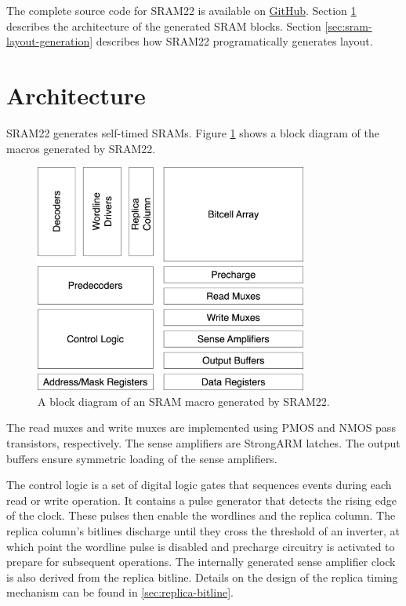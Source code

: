 The complete source code for SRAM22 is available on \href{https://github.com/rahulk29/sram22}{GitHub}.
Section \ref{sec:sram-architecture} describes the architecture of the generated SRAM blocks.
Section \ref{sec:sram-layout-generation} describes how SRAM22 programatically generates layout.

\section{Architecture} \label{sec:sram-architecture}

SRAM22 generates self-timed SRAMs. Figure \ref{fig:sram22-block-diagram} shows a block diagram
of the macros generated by SRAM22.

\begin{figure}[H] \centering
\includegraphics[width=0.8\textwidth]{figures/sram22_block_diagram.png}
\caption{A block diagram of an SRAM macro generated by SRAM22. \label{fig:sram22-block-diagram}}
\end{figure}

The read muxes and write muxes are implemented using PMOS and NMOS pass transistors, respectively.
The sense amplifiers are StrongARM latches. The output buffers ensure symmetric loading of the sense amplifiers.

The control logic is a set of digital logic gates that sequences events during each read or write operation.
It contains a pulse generator that detects the rising edge of the clock. These pulses then enable the wordlines
and the replica column. The replica column's bitlines discharge until they cross the threshold
of an inverter, at which point the wordline pulse is disabled and precharge circuitry is activated
to prepare for subsequent operations.
The internally generated sense amplifier clock is also derived
from the replica bitline. Details on the design of the replica timing mechanism can be found in \ref{sec:replica-bitline}.


